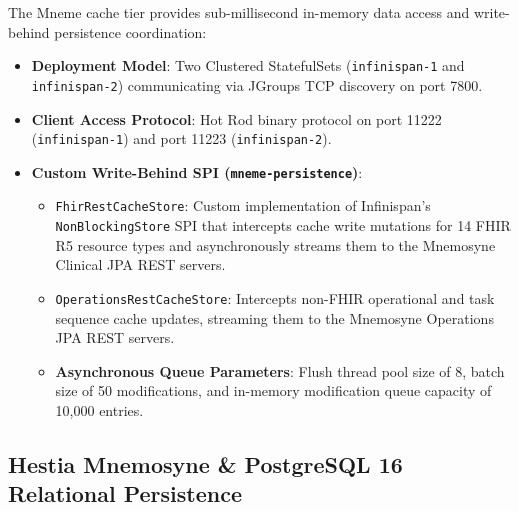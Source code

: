 The Mneme cache tier provides sub-millisecond in-memory data access and write-behind persistence coordination:
\begin{itemize}
    \item \textbf{Deployment Model}: Two Clustered StatefulSets (\texttt{infinispan-1} and \texttt{infinispan-2}) communicating via JGroups TCP discovery on port 7800.
    \item \textbf{Client Access Protocol}: Hot Rod binary protocol on port 11222 (\texttt{infinispan-1}) and port 11223 (\texttt{infinispan-2}).
    \item \textbf{Custom Write-Behind SPI (\texttt{mneme-persistence})}:
    \begin{itemize}
        \item \texttt{FhirRestCacheStore}: Custom implementation of Infinispan's \texttt{NonBlockingStore} SPI that intercepts cache write mutations for 14 FHIR R5 resource types and asynchronously streams them to the Mnemosyne Clinical JPA REST servers.
        \item \texttt{OperationsRestCacheStore}: Intercepts non-FHIR operational and task sequence cache updates, streaming them to the Mnemosyne Operations JPA REST servers.
        \item \textbf{Asynchronous Queue Parameters}: Flush thread pool size of 8, batch size of 50 modifications, and in-memory modification queue capacity of 10,000 entries.
    \end{itemize}
\end{itemize}

\subsection{Hestia Mnemosyne \& PostgreSQL 16 Relational Persistence}

